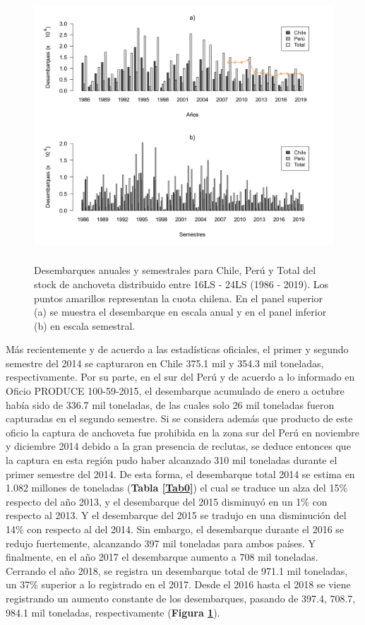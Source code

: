\documentclass[letter,11pt]{article}
\begin{document}
\vspace{0.5cm}
\begin{figure}[htb!]
 \centering
 \includegraphics[width=17.3cm,height=10.1cm]{fig/figura0.pdf}
 \caption{Desembarques anuales y semestrales para Chile, Per\'u y Total del stock de anchoveta distribuido entre 16\degree LS - 24\degree LS (1986 - 2019). Los puntos amarillos representan la cuota chilena. En el panel superior (a) se muestra el desembarque en escala anual y en el panel inferior (b) en escala semestral.}
 \label{Fig0}
\end{figure}
\vspace{0.5cm}



M\'as recientemente y de acuerdo a las estad\'isticas oficiales, el primer y
segundo semestre del 2014 se capturaron en Chile 375.1 mil y 354.3 mil
toneladas, respectivamente. Por su parte, en el sur del Per\'u y de
acuerdo a lo informado en Oficio PRODUCE 100-59-2015, el desembarque
acumulado de enero a octubre hab\'ia sido de 336.7 mil toneladas, de las
cuales solo 26 mil toneladas fueron capturadas en el segundo semestre.
Si se considera adem\'as que producto de este oficio la captura de
anchoveta fue prohibida en la zona sur del Per\'u en noviembre y diciembre
2014 debido a la gran presencia de reclutas, se deduce entonces que la
captura en esta regi\'on pudo haber alcanzado 310 mil toneladas durante el
primer semestre del 2014. De esta forma, el desembarque total 2014 se
estima en 1.082 millones de toneladas (\textbf{Tabla \ref{Tab0}}) el
cual se traduce un alza del 15\% respecto del a\~{n}o 2013, y el desembarque
del 2015 disminuy\'o en un 1\% con respecto al 2013. Y el desembarque del
2015 se tradujo en una disminuci\'on del 14\% con respecto al del 2014.
Sin embargo, el desembarque durante el 2016 se redujo fuertemente,
alcanzando 397 mil toneladas para ambos pa\'ises. Y finalmente, en el a\~{n}o
2017 el desembarque aumento a 708 mil toneladas. Cerrando el a\~{n}o 2018,
se registra un desembarque total de 971.1 mil toneladas, un 37\%
superior a lo registrado en el 2017. Desde el 2016 hasta el 2018 se
viene registrando un aumento constante de los desembarques, pasando de
397.4, 708.7, 984.1 mil toneladas, respectivamente
(\textbf{Figura \ref{Fig0}}). \\
\end{document}
